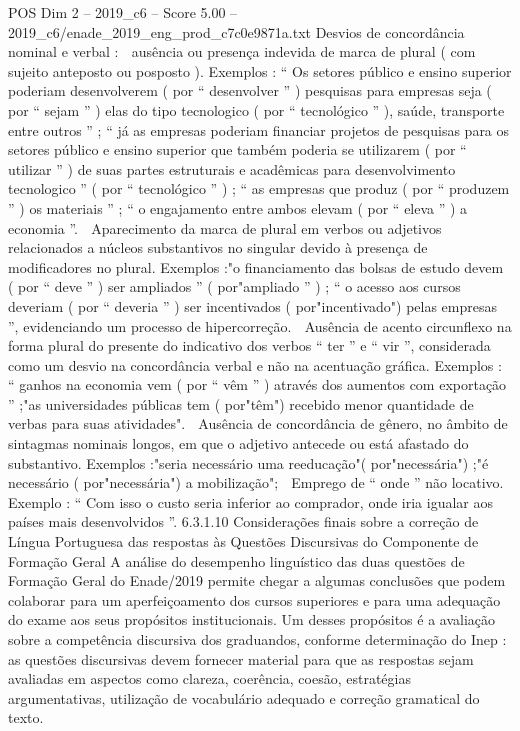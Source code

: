 \begin{textsample}{POS Dim 2 – 2019\_c6 – Score 5.00 – 2019\_c6/enade\_2019\_eng\_prod\_c7c0e9871a.txt}
Desvios de concordância nominal e verbal :  ausência ou presença indevida de marca de plural ( com sujeito anteposto ou posposto ).
Exemplos : “ Os setores público e ensino superior poderiam desenvolverem ( por “ desenvolver ” ) pesquisas para empresas seja ( por “ sejam ” ) elas do tipo tecnologico ( por “ tecnológico ” ), saúde, transporte entre outros ” ; “ já as empresas poderiam financiar projetos de pesquisas para os setores público e ensino superior que também poderia se utilizarem ( por “ utilizar ” ) de suas partes estruturais e acadêmicas para desenvolvimento tecnologico ” ( por “ tecnológico ” ) ; “ as empresas que produz ( por “ produzem ” ) os materiais ” ; “ o engajamento entre ambos elevam ( por “ eleva ” ) a economia ”.  Aparecimento da marca de plural em verbos ou adjetivos relacionados a núcleos substantivos no singular devido à presença de modificadores no plural.
Exemplos :"o financiamento das bolsas de estudo devem ( por “ deve ” ) ser ampliados ” ( por"ampliado ” ) ; “ o acesso aos cursos deveriam ( por “ deveria ” ) ser incentivados ( por"incentivado") pelas empresas ”, evidenciando um processo de hipercorreção.  Ausência de acento circunflexo na forma plural do presente do indicativo dos verbos “ ter ” e “ vir ”, considerada como um desvio na concordância verbal e não na acentuação gráfica.
Exemplos : “ ganhos na economia vem ( por “ vêm ” ) através dos aumentos com exportação ” ;"as universidades públicas tem ( por"têm") recebido menor quantidade de verbas para suas atividades".  Ausência de concordância de gênero, no âmbito de sintagmas nominais longos, em que o adjetivo antecede ou está afastado do substantivo.
Exemplos :"seria necessário uma reeducação"( por"necessária") ;"é necessário ( por"necessária") a mobilização";  Emprego de “ onde ” não locativo.
Exemplo : “ Com isso o custo seria inferior ao comprador, onde iria igualar aos países mais desenvolvidos ”. 6.3.1.10 Considerações finais sobre a correção de Língua Portuguesa das respostas às Questões Discursivas do Componente de Formação Geral A análise do desempenho linguístico das duas questões de Formação Geral do Enade/2019 permite chegar a algumas conclusões que podem colaborar para um aperfeiçoamento dos cursos superiores e para uma adequação do exame aos seus propósitos institucionais.
Um desses propósitos é a avaliação sobre a competência discursiva dos graduandos, conforme determinação do Inep : as questões discursivas devem fornecer material para que as respostas sejam avaliadas em aspectos como clareza, coerência, coesão, estratégias argumentativas, utilização de vocabulário adequado e correção gramatical do texto.

\end{textsample}
